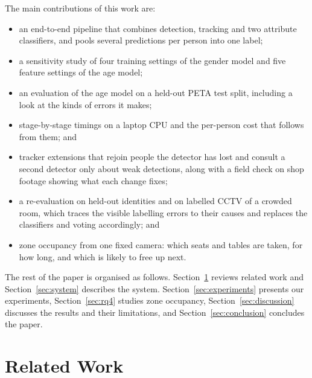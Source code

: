 \documentclass[conference]{IEEEtran}
\begin{document}
The main contributions of this work are:
\begin{itemize}
  \item an end-to-end pipeline that combines detection, tracking and two attribute
        classifiers, and pools several predictions per person into one label;
  \item a sensitivity study of four training settings of the gender model and
        five feature settings of the age model;
  \item an evaluation of the age model on a held-out PETA test split, including a
        look at the kinds of errors it makes;
  \item stage-by-stage timings on a laptop CPU and the per-person cost that
        follows from them; and
  \item tracker extensions that rejoin people the detector has lost and consult a
        second detector only about weak detections, along with a field check on
        shop footage showing what each change fixes;
  \item a re-evaluation on held-out identities and on labelled CCTV of a crowded
        room, which traces the visible labelling errors to their causes and
        replaces the classifiers and voting accordingly; and
  \item zone occupancy from one fixed camera: which seats and tables are taken,
        for how long, and which is likely to free up next.
\end{itemize}

The rest of the paper is organised as follows. Section~\ref{sec:related} reviews
related work and Section~\ref{sec:system} describes the system.
Section~\ref{sec:experiments} presents our experiments, Section~\ref{sec:rq4}
studies zone occupancy, Section~\ref{sec:discussion} discusses the results and
their limitations, and
Section~\ref{sec:conclusion} concludes the paper.

\section{Related Work}
\label{sec:related}
\end{document}
